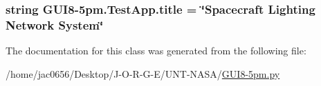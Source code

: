 \subsubsection[{\texorpdfstring{title}{title}}]{\setlength{\rightskip}{0pt plus 5cm}string G\+U\+I8-\/5pm.\+Test\+App.\+title = \char`\"{}Spacecraft Lighting Network System\char`\"{}\hspace{0.3cm}{\ttfamily [static]}}\hypertarget{classGUI8-5pm_1_1TestApp_aaf20aea8d1d7e764a5d16f394b9ea004}{}\label{classGUI8-5pm_1_1TestApp_aaf20aea8d1d7e764a5d16f394b9ea004}


The documentation for this class was generated from the following file\+:\begin{DoxyCompactItemize}
\item 
/home/jac0656/\+Desktop/\+J-\/\+O-\/\+R-\/\+G-\/\+E/\+U\+N\+T-\/\+N\+A\+S\+A/\hyperlink{GUI8-5pm_8py}{G\+U\+I8-\/5pm.\+py}\end{DoxyCompactItemize}
